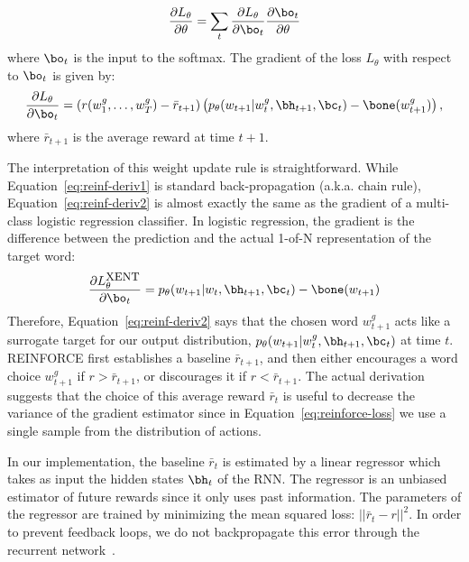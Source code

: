 \begin{equation}
\frac{\partial L_{\theta}}{\partial \theta} = \sum_t \frac{\partial L_{\theta}}{\partial \bo_t}
\frac{\partial \bo_t}{\partial \theta} \label{eq:reinf-deriv1}
\end{equation}
where $\bo_t$ is the input to the softmax. 
The gradient of the loss $L_{\theta}$ with respect to $\bo_t$ is given by:
\begin{equation}
\frac{\partial L_{\theta}}{\partial \bo_t} = \left( r(w^g_1, \dots, w^g_T) - \bar{r}_{t+1} \right) \left( p_\theta(w_{t+1} | w^g_{t}, \bh_{t+1}, \bc_t) - \bone(w^g_{t+1}) \right),
 \label{eq:reinf-deriv2}
\end{equation}
where $\bar{r}_{t+1}$ is the average reward at time $t + 1$. 

The interpretation of this weight update rule is straightforward. While
Equation~\ref{eq:reinf-deriv1} is standard back-propagation (a.k.a. chain
rule), Equation~\ref{eq:reinf-deriv2} is almost exactly the same as the gradient of a multi-class logistic regression classifier. In logistic regression, the gradient is the difference between the prediction and the actual 1-of-N representation of the target word:
\begin{equation*}
\frac{\partial L^{\mbox{\small XENT}}_{\theta}}{\partial \bo_t} 
 =  p_\theta(w_{t+1} | w_{t}, \bh_{t+1}, \bc_t) - \bone(w_{t+1})
\end{equation*}
Therefore, Equation~\ref{eq:reinf-deriv2} says that the chosen word $w^g_{t+1}$
acts like a surrogate target for our output distribution,
$p_\theta(w_{t+1}|w^g_{t}, \bh_{t+1}, \bc_t)$ at time $t$. REINFORCE first establishes a baseline $\bar{r}_{t+1}$,
and then either encourages a word choice $w^g_{t+1}$ if $r > \bar{r}_{t+1}$, 
or discourages it if $r < \bar{r}_{t+1}$. The actual derivation suggests that the choice of this average reward $\bar{r}_t$ is useful to decrease the variance of the gradient estimator since in Equation~\ref{eq:reinforce-loss} we use a single sample from the distribution of actions. 

In our implementation, the baseline $\bar{r}_t$ is estimated by a linear regressor which takes as input the hidden states $\bh_t$ of the RNN. The regressor is an unbiased estimator of future rewards since it only uses past information. The parameters of the regressor are
trained by minimizing the mean squared loss: $||\bar{r}_t - r||^2$.
In order to prevent feedback loops, we do not backpropagate this error through
the recurrent network~\citep{zaremba-arxiv2015}. 

